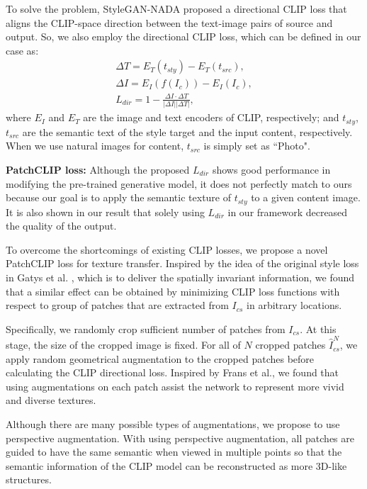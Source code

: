 \documentclass[10pt,twocolumn,letterpaper]{article}
\begin{document}
To solve the problem, StyleGAN-NADA\cite{nada} proposed a directional CLIP loss that aligns the CLIP-space direction between the text-image pairs of source and output. So, we also employ the directional CLIP loss, which can be defined in our case as:
\begin{align}
\Delta T = E_{T}(t_{sty}) - E_{T}(t_{src}),\nonumber\\
\Delta I = E_{I}(f(I_c)) - E_{I}(I_c),\nonumber\\
L_{dir} = 1-\frac{\Delta I\cdot \Delta T}{|\Delta I||\Delta T|},
\end{align}
where $E_I$ and $E_T$ are the image and text encoders of CLIP, respectively;  and $t_{sty}$, $t_{src}$ are the semantic text of the style target and the input content, respectively. When we use natural images for content, $t_{src}$ is simply set as ``Photo".

\noindent \textbf{PatchCLIP loss:} Although the proposed $L_{dir}$ shows good performance in modifying the pre-trained generative model, it does not perfectly match to ours because our goal is to apply the semantic texture of $t_{sty}$ to a given content image. It is also shown in our result that solely using $L_{dir}$ in our framework decreased the quality of the output.

To overcome the shortcomings of existing CLIP losses, we propose a novel PatchCLIP loss for texture transfer. Inspired by the idea of the original style loss in Gatys et al. \cite{gatys}, which is to deliver the spatially invariant information, we found that a similar effect can be obtained by minimizing CLIP loss functions with respect to group of patches that are extracted from $I_{cs}$ in arbitrary locations.

Specifically, we randomly crop sufficient number of patches from $I_{cs}$. At this stage, the size of the cropped image is fixed. For all of $N$ cropped patches $\hat{I}^N_{cs}$, we apply random geometrical augmentation to the cropped patches before calculating the CLIP directional loss. {Inspired by Frans et al.\cite{clipdraw}}, we found that using augmentations on each patch assist the network to represent more vivid and diverse textures.  

Although there are many possible types of augmentations, we propose to use perspective augmentation. 
With using perspective augmentation,  all patches are guided to have the same semantic when viewed in multiple points so that
 the semantic information of the CLIP model can be reconstructed as more 3D-like structures. 
\end{document}
